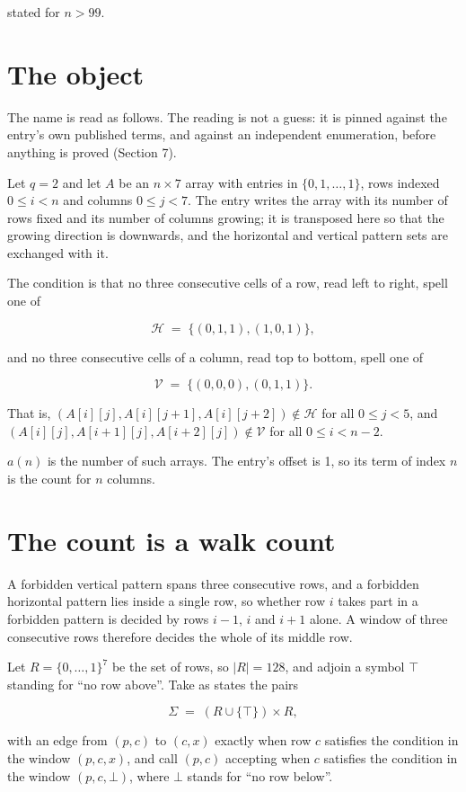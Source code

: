 \documentclass[11pt]{article}
\theoremstyle{definition}
\begin{document}
stated for $n > 99$.

\section{The object}

The name is read as follows. The reading is not a guess: it is pinned against the entry's own published terms, and against an independent enumeration, before anything is proved (Section 7).

Let $q = 2$ and let $A$ be an $n \times 7$ array with entries in $\{0,1,\dots,1\}$, rows indexed $0 \le i < n$ and columns $0 \le j < 7$. The entry writes the array with its number of rows fixed and its number of columns growing; it is transposed here so that the growing direction is downwards, and the horizontal and vertical pattern sets are exchanged with it.

The condition is that no three consecutive cells of a row, read left to right, spell one of

\[\mathcal{H} \;=\; \{(0,1,1), (1,0,1)\},\]

and no three consecutive cells of a column, read top to bottom, spell one of

\[\mathcal{V} \;=\; \{(0,0,0), (0,1,1)\}.\]

That is, $(A[i][j],A[i][j{+}1],A[i][j{+}2]) \notin \mathcal{H}$ for all $0 \le j < 5$, and $(A[i][j],A[i{+}1][j],A[i{+}2][j]) \notin \mathcal{V}$ for all $0 \le i < n-2$.

$a(n)$ is the number of such arrays. The entry's offset is 1, so its term of index $n$ is the count for $n$ columns.

\section{The count is a walk count}

A forbidden vertical pattern spans three consecutive rows, and a forbidden horizontal pattern lies inside a single row, so whether row $i$ takes part in a forbidden pattern is decided by rows $i-1$, $i$ and $i+1$ alone. A window of three consecutive rows therefore decides the whole of its middle row.

Let $R = \{0,\dots,1\}^{7}$ be the set of rows, so $|R| = 128$, and adjoin a symbol $\top$ standing for ``no row above''. Take as states the pairs

\[\Sigma \;=\; (R \cup \{\top\}) \times R,\]

with an edge from $(p,c)$ to $(c,x)$ exactly when row $c$ satisfies the condition in the window $(p,c,x)$, and call $(p,c)$ accepting when $c$ satisfies the condition in the window $(p,c,\bot)$, where $\bot$ stands for ``no row below''.
\end{document}
